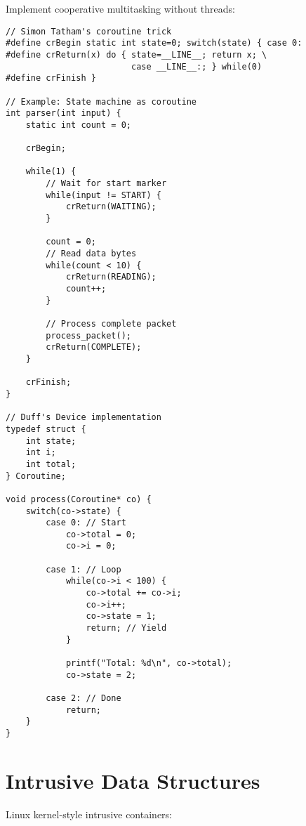 Implement cooperative multitasking without threads:

\begin{lstlisting}
// Simon Tatham's coroutine trick
#define crBegin static int state=0; switch(state) { case 0:
#define crReturn(x) do { state=__LINE__; return x; \
                         case __LINE__:; } while(0)
#define crFinish }

// Example: State machine as coroutine
int parser(int input) {
    static int count = 0;

    crBegin;

    while(1) {
        // Wait for start marker
        while(input != START) {
            crReturn(WAITING);
        }

        count = 0;
        // Read data bytes
        while(count < 10) {
            crReturn(READING);
            count++;
        }

        // Process complete packet
        process_packet();
        crReturn(COMPLETE);
    }

    crFinish;
}

// Duff's Device implementation
typedef struct {
    int state;
    int i;
    int total;
} Coroutine;

void process(Coroutine* co) {
    switch(co->state) {
        case 0: // Start
            co->total = 0;
            co->i = 0;

        case 1: // Loop
            while(co->i < 100) {
                co->total += co->i;
                co->i++;
                co->state = 1;
                return; // Yield
            }

            printf("Total: %d\n", co->total);
            co->state = 2;

        case 2: // Done
            return;
    }
}
\end{lstlisting}

\section{Intrusive Data Structures}

Linux kernel-style intrusive containers:

